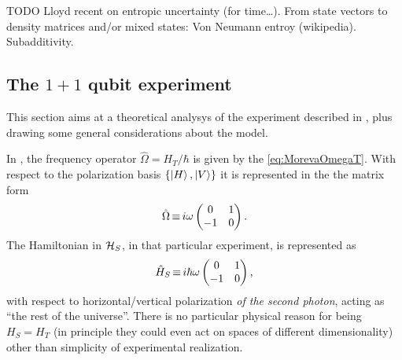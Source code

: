 TODO Lloyd recent on entropic uncertainty (for time\dots).
From state vectors to density matrices and/or mixed states: Von Neumann entroy (wikipedia).
Subadditivity. 
\fi

\subsection{The $1 + 1$ qubit experiment}\label{1qubitExp}

This section aims at a theoretical analysys of the experiment
described in \cite{Moreva:synthetic, Moreva:illustration},
plus drawing some general considerations about the model. 

In \cite{Moreva:illustration}, the frequency operator $\hat{\Omega} = H_T / \hbar$
is given by the \eqref{eq:MorevaOmegaT}. With respect to the polarization basis
$\qty{\ket{H}, \ket{V}}$ it is represented in the the matrix form
\begin{equation}
  \hat{\Omega} \operatorname*{\equiv} {
    i\omega
    \begin{pmatrix}
      0 & 1 \\
     -1 & 0
    \end{pmatrix}
  } \, \text{.}
\end{equation}
The Hamiltonian in $\mathcal{H}_S$, in that particular experiment, is represented as
\begin{equation}\label{eq:H_S}
  \hat{H}_S \operatorname*{\equiv} {
    i\hbar\omega
    \begin{pmatrix}
      0 & 1 \\
     -1 & 0
    \end{pmatrix}
  } \, \text{,}
\end{equation}
with respect to horizontal/vertical polarization \emph{of the second photon},
acting as ``the rest of the universe''.
There is no particular physical reason for being $H_S = H_T$
(in principle they could even act on spaces of different dimensionality)
other than simplicity of experimental realization.

